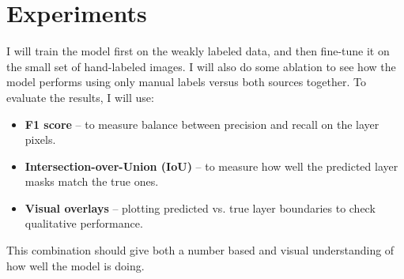 \documentclass{article}
\begin{document}
\section*{Experiments}

I will train the model first on the weakly labeled data, and then fine-tune it on the small set of hand-labeled images. I will also do some ablation to see how the model performs using only manual labels versus both sources together. To evaluate the results, I will use:
\begin{itemize}
    \item \textbf{F1 score} – to measure balance between precision and recall on the layer pixels.
    \item \textbf{Intersection-over-Union (IoU)} – to measure how well the predicted layer masks match the true ones.
    \item \textbf{Visual overlays} – plotting predicted vs. true layer boundaries to check qualitative performance.
\end{itemize}
This combination should give both a number based and visual understanding of how well the model is doing.
\end{document}
